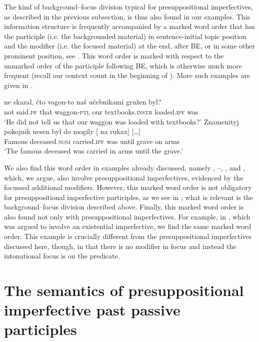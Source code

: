 \documentclass[output=paper,
modfonts,
newtxmath,
hidelinks
]{langscibook}
\begin{document}
\noindent The kind of background--focus division typical for presuppositional imperfectives, as described in the previous subsection, is thus also found in our examples. This information structure is frequently accompanied by a marked word order that has the participle (i.e. the backgrounded material) in sentence-initial topic position and the modifier (i.e. the focused material) at the end, after BE, or in some other prominent position, see . This word order is marked with respect to the unmarked order of the participle following BE, which is otherwise much more frequent (recall our context count in the beginning of ). More such examples are given in .

\ea\label{presOF-WO}
\ea\gll	[...] ne skazal, čto vagon-to naš učebnikami gružen byl?\\
	{} not said.\textsc{pf} that waggon-\textsc{ptl} our textbooks.\textsc{instr} loaded.\textsc{ipf} was\\
\glt	`He did not tell us that our waggon was loaded with textbooks?'\label{textbooks}
\ex\gll Znamenityj pokojnik nesen byl do mogily {\hspace{60pt}} [\hspace{-2pt} na rukax] [\dots] \label{nesen} \\
	Famous deceased.\textsc{nom} carried.\textsc{ipf} was until grave {} {} on arms\\
\glt	`The famous deceased was carried in arms until the grave.'
\z\z

\noindent We also find this word order in examples already discussed, namely , --, , and , which, we argue, also involve presuppositional imperfectives, evidenced by the focussed additional modifiers. However, this marked word order is not obligatory for presuppositional imperfective participles, as we see in ; what is relevant is the background--focus division described above. Finally, this marked word order is also found not only with presuppositional imperfectives. For example, in , which was argued to involve an existential imperfective, we find the same marked word order. This example is crucially different from the presuppositional imperfectives discussed here, though, in that there is no modifier in focus and instead the intonational focus is on the predicate.

\section{The semantics of presuppositional imperfective past passive participles}
\label{analysis}
\end{document}
